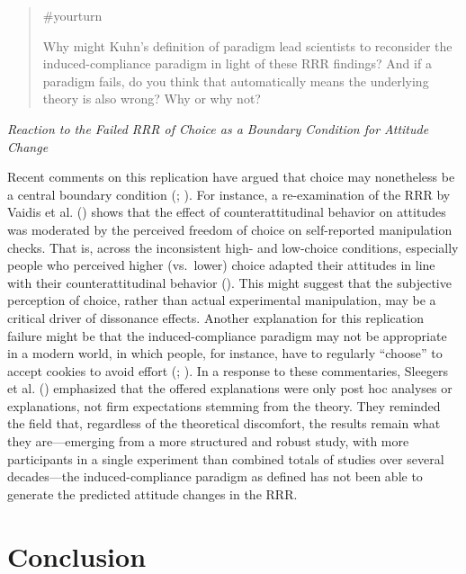 \documentclass[
  letterpaper,
]{book}
\begin{document}
\begin{quote}
{\#yourturn}

Why might Kuhn's definition of paradigm lead scientists to reconsider
the induced-compliance paradigm in light of these RRR findings? And if a
paradigm fails, do you think that automatically means the underlying
theory is also wrong? Why or why not?
\end{quote}

\emph{Reaction to the Failed RRR of Choice as a Boundary Condition for
Attitude Change}

Recent comments on this replication have argued that choice may
nonetheless be a central boundary condition
(; ). For instance, a re-examination of the RRR by Vaidis et al.
()
shows that the effect of counterattitudinal behavior on attitudes was
moderated by the perceived freedom of choice on self-reported
manipulation checks. That is, across the inconsistent high- and
low-choice conditions, especially people who perceived higher
(vs.~lower) choice adapted their attitudes in line with their
counterattitudinal behavior (). This might suggest that the subjective perception of
choice, rather than actual experimental manipulation, may be a critical
driver of dissonance effects. Another explanation for this replication
failure might be that the induced-compliance paradigm may not be
appropriate in a modern world, in which people, for instance, have to
regularly ``choose'' to accept cookies to avoid effort
(; ). In a response to these commentaries, Sleegers et al.
() emphasized that
the offered explanations were only post hoc analyses or explanations,
not firm expectations stemming from the theory. They reminded the field
that, regardless of the theoretical discomfort, the results remain what
they are---emerging from a more structured and robust study, with more
participants in a single experiment than combined totals of studies over
several decades---the induced-compliance paradigm as defined has not
been able to generate the predicted attitude changes in the RRR.

\section{Conclusion}\label{conclusion-1}
\end{document}
